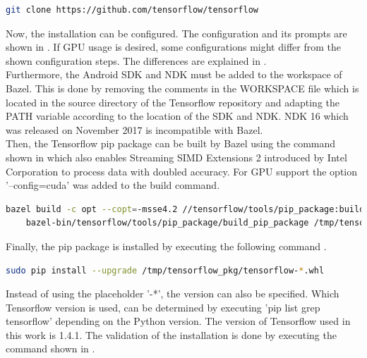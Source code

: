 \begin{lstlisting}[caption=Cloning the tensorflow repository, label=list:clone_tensorflow, language=bash]
	git clone https://github.com/tensorflow/tensorflow		
\end{lstlisting}

Now, the installation can be configured. The configuration and its prompts are shown in . If GPU usage is desired, some configurations might differ from the shown configuration steps. The differences are explained in .\\

Furthermore, the Android SDK and NDK must be added to the workspace of Bazel. This is done by removing the comments in the WORKSPACE file which is located in the source directory of the Tensorflow repository and adapting the PATH variable according to the location of the SDK and NDK. NDK 16 which was released on November 2017 is incompatible with Bazel. \\

Then, the Tensorflow pip package can be built by Bazel using the command shown in  which also enables Streaming SIMD Extensions 2 introduced by Intel Corporation to process data with doubled accuracy. For GPU support the option '--config=cuda' was added to the build command.

\begin{lstlisting}[caption=Building the Tensorflow pip package, label=list:pip_package, language=bash]
	bazel build -c opt --copt=-msse4.2 //tensorflow/tools/pip_package:build_pip_package
	bazel-bin/tensorflow/tools/pip_package/build_pip_package /tmp/tensorflow_pkg
\end{lstlisting}

Finally, the pip package is installed by executing the following command .

\begin{lstlisting}[caption=Installing the pip package, label=list:pip_install, language=bash]
	sudo pip install --upgrade /tmp/tensorflow_pkg/tensorflow-*.whl
\end{lstlisting}

Instead of using the placeholder '-*', the version can also be specified. Which Tensorflow version is used, can be determined by executing 'pip list \big \vert grep tensorflow' depending on the Python version. The version of Tensorflow used in this work is 1.4.1. The validation of the installation is done by executing the command shown in .

